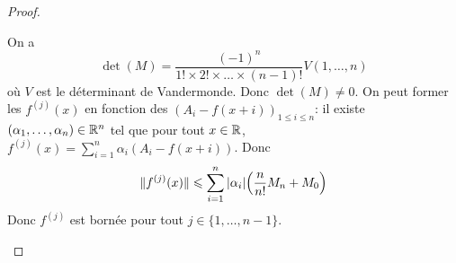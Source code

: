\begin{proof}
\begin{enumerate}
		On a 
		\begin{equation}\det(M)=\frac{(-1)^{n}}{1!\times 2!\times\dots\times (n-1)!}V(1,\dots,n)\end{equation}
		où $V$ est le déterminant de Vandermonde. Donc $\det(M)\neq0$. On peut former les $f^{(j)}(x)$ en fonction des $(A_{i}-f(x+i))_{1\leqslant i\leqslant n}$: il existe $(\alpha_{1},\dots,\alpha_{n})\in\mathbb{R}^{n}$ tel que pour tout $x\in\mathbb{R}$, $f^{(j)}(x)=\sum_{i=1}^{n}\alpha_{i}(A_{i}-f(x+i))$. Donc 
		\begin{equation}\Vert f^{(j)}(x)\Vert\leqslant\sum_{i=1}^{n}\vert\alpha_{i}\vert\Bigl(\frac{n}{n!}M_{n}+M_{0}\Bigr)\end{equation}
		Donc $f^{(j)}$ est bornée pour tout $j\in\{1,\dots,n-1\}$.
	\end{enumerate}
\end{proof}

